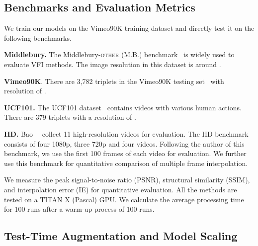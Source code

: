\documentclass[final]{cvpr}
\begin{document}
\subsection{Benchmarks and Evaluation Metrics}
We train our models on the Vimeo90K training dataset and directly test it on the following benchmarks. 

\textbf{Middlebury.} The Middlebury-\textsc{other} (M.B.) benchmark~\cite{baker2011database} is widely used to evaluate VFI methods. The image resolution in this dataset is around . 

\textbf{Vimeo90K}.
There are 3,782 triplets in the Vimeo90K testing set~\cite{xue2019video} with resolution of .


\textbf{UCF101.}
The UCF101 dataset~\cite{soomro2012ucf101} contains videos with various human actions. There are 379 triplets with a resolution of .



\textbf{HD.}
Bao~\etal~\cite{bao2019memc} collect 11 high-resolution videos for evaluation. The HD benchmark consists of four 1080p, three 720p and four  videos. Following the author of this benchmark, we use the first 100 frames of each video for evaluation. We further use this benchmark for quantitative comparison of multiple frame interpolation.

We measure the peak signal-to-noise ratio (PSNR), structural similarity (SSIM), and interpolation error (IE) for quantitative evaluation. All the methods are tested on a TITAN X (Pascal) GPU. We calculate the average processing time for 100 runs after a warm-up process of 100 runs. 



\subsection{Test-Time Augmentation and Model Scaling}
\label{sec:model_scaling}
\end{document}
